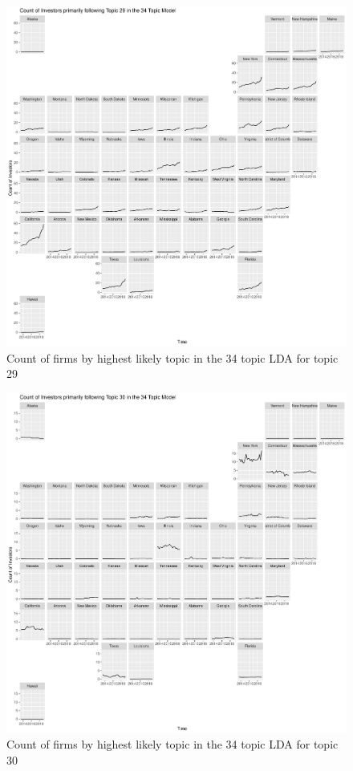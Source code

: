 \begin{figure}
	\centering
	\includegraphics[width=1\linewidth]{Figures/ChapterV/USA_34_Topic29.pdf}
	\caption[Count of Firms for Topic 29 by Quarter]{Count of firms by highest likely topic in the 34 topic LDA for topic 29}
	\label{fig:StateLDA29}
\end{figure}

\begin{figure}
	\centering
	\includegraphics[width=1\linewidth]{Figures/ChapterV/USA_34_Topic30.pdf}
	\caption[Count of Firms for Topic 30 by Quarter]{Count of firms by highest likely topic in the 34 topic LDA for topic 30}
	\label{fig:StateLDA30}
\end{figure}

